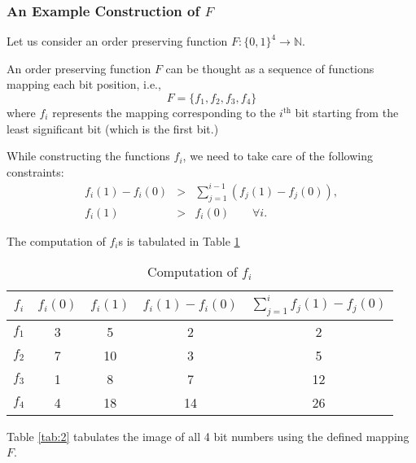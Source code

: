 \documentclass[11pt, letterpaper, romanappendices, onecolumn]{article}
\theoremstyle{plain}\newtheorem{thm}{Theorem}[section]
\theoremstyle{definition}
\theoremstyle{remark}
\begin{document}
\subsubsection{An Example Construction of $F$} \label{excons}
Let us consider an order preserving function $F: \lbrace 0,1 \rbrace^4 \rightarrow \mathbb{N}$.

\par An order preserving function $F$ can be thought as a sequence of functions mapping each bit position, i.e., 
\[
	F = \lbrace f_{1} , f_{2}, f_{3}, f_{4}\rbrace
\]
where $f_i$ represents the mapping corresponding to the $i^\text{th}$ bit starting from the least significant bit (which is the first bit.)
\newline

\par While constructing the functions $f_i$, we need to take care of the following constraints:
\begin{eqnarray*}
	f_{i}(1) - f_{i}(0) &>& \displaystyle\sum\limits^{i-1}_{j=1}(f_{j}(1)-f_{j}(0)),\\
	f_{i}(1) &>& f_{i}(0) \qquad  \forall i.
\end{eqnarray*}

\par The computation of $f_i$s is tabulated in Table \ref{tab:1}

\begin{table}
	\begin{center}
	\begin{tabular}{|c|c|c|c|c|}
	\hline 
		$f_{i}$ & $f_{i}(0)$ & $f_{i}(1)$ & $f_{i}(1) - f_{i}(0)$ & $\sum\limits_{j=1}^{i} f_{j}(1)-f_{j}(0)$ \\\hline 
		$f_{1}$ & 3 & 5 & 2 & 2 \\\hline
		$f_{2}$ & 7 & 10 & 3 & 5 \\\hline
		$f_{3}$ & 1 & 8 & 7 & 12 \\\hline
		$f_{4}$ & 4 & 18 & 14 & 26 \\\hline
	\end{tabular}
	\end{center}
	\caption{Computation of $f_{i}$} \label{tab:1}
\end{table}

Table \ref{tab:2} tabulates the image of all 4 bit numbers using the defined mapping $F$. 
\end{document}
